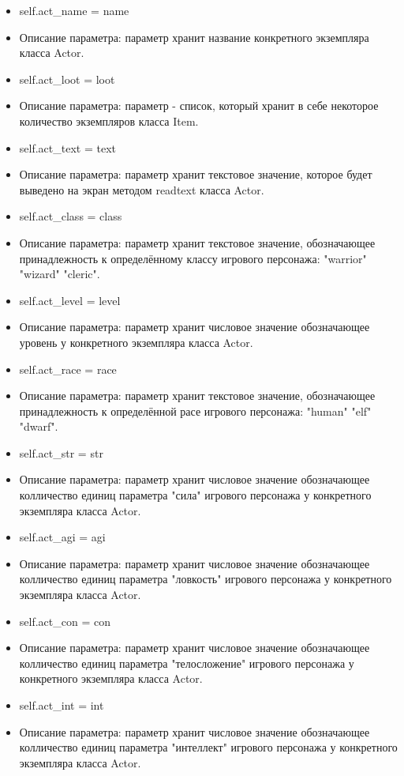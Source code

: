 \begin{itemize}
	\item self.act\_name = name 
	\item Описание параметра: параметр хранит название конкретного экземпляра класса Actor.
	\item self.act\_loot = loot 
	\item Описание параметра: параметр - список, который хранит в себе некоторое количество экземпляров класса Item.
	\item self.act\_text = text 
	\item Описание параметра: параметр хранит текстовое значение, которое будет выведено на экран методом readtext класса Actor.
	\item self.act\_class = class 
	\item Описание параметра: параметр хранит текстовое значение, обозначающее принадлежность к определённому классу игрового персонажа: "warrior" "wizard" "cleric".
	\item self.act\_level = level 
	\item Описание параметра: параметр хранит числовое значение обозначающее уровень у конкретного экземпляра класса Actor.
	\item self.act\_race = race 
	\item Описание параметра: параметр хранит текстовое значение, обозначающее принадлежность к определённой расе игрового персонажа: "human" "elf" "dwarf".
	\item self.act\_str = str 
	\item Описание параметра: параметр хранит числовое значение обозначающее колличество единиц параметра "сила" игрового персонажа у конкретного экземпляра класса Actor.
	\item self.act\_agi = agi 
	\item Описание параметра: параметр хранит числовое значение обозначающее колличество единиц параметра "ловкость" игрового персонажа у конкретного экземпляра класса Actor.
	\item self.act\_con = con 
	\item Описание параметра: параметр хранит числовое значение обозначающее колличество единиц параметра "телосложение" игрового персонажа у конкретного экземпляра класса Actor.
	\item self.act\_int = int 
	\item Описание параметра: параметр хранит числовое значение обозначающее колличество единиц параметра "интеллект" игрового персонажа у конкретного экземпляра класса Actor.

\end{itemize}
